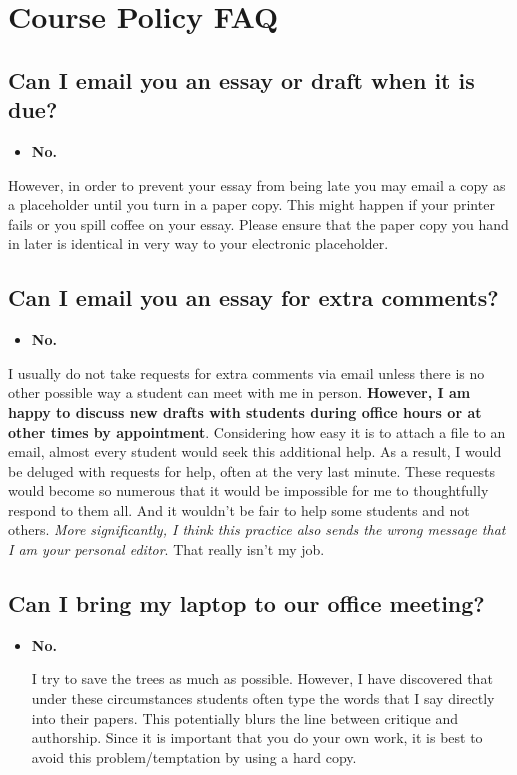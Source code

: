 \chapter{Course Policy FAQ}

\section{Can I email you an essay or draft when it is due?}
\begin{itemize}

\item {\Large \color{Ahrenge}\textbf{No.}} 
\end{itemize}

However, in order to prevent your essay from being late you may email a copy as a placeholder until you turn in a paper copy. This might happen if your printer fails or you spill coffee on your essay. Please ensure that the paper copy you hand in later is identical in very way to your electronic placeholder.


\section{Can I email you an essay for extra comments?}
\begin{itemize}

\item {\Large \color{Ahrenge}\textbf{No.}} 
\end{itemize}


I usually do not take requests for extra comments via email unless there is no other possible way a student can meet with me in person. \textbf{However, I am happy to discuss new drafts with students during office hours or at other times by appointment}. Considering how easy it is to attach a file to an email, almost every student would seek this additional help. As a result, I would be deluged with requests for help, often at the very last minute. These requests would become so numerous that it would be impossible for me to thoughtfully respond to them all. And it wouldn’t be fair to help some students and not others. \emph{More significantly, I think this practice also sends the wrong message that I am your personal editor}. That really isn’t my job.

\section{Can I bring my laptop to our office meeting?}
\begin{itemize}
\item {\Large \color{Ahrenge}\textbf{No.}} 

I try to save the trees as much as possible. However, I have discovered that under these circumstances students often type the words that I say directly into their papers. This potentially blurs the line between critique and authorship. Since it is important that you do your own work, it is best to avoid this problem/temptation by using a hard copy.
\end{itemize}

